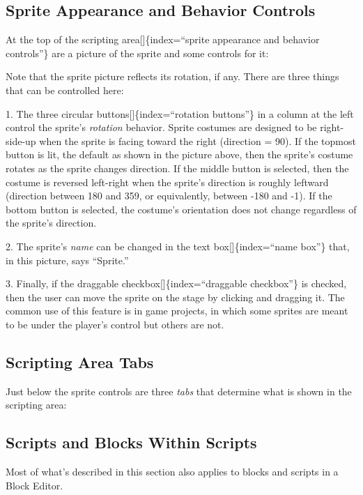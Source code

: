 \documentclass[
  letterpaper,
]{book}
\begin{document}
\subsection{Sprite Appearance and Behavior
Controls}\label{sprite-appearance-and-behavior-controls}

At the top of the scripting area{[}{]}\{index=``sprite appearance and
behavior controls''\} are a picture of the sprite and some controls for
it:

Note that the sprite picture reflects its rotation, if any. There are
three things that can be controlled here:

1. The three circular buttons{[}{]}\{index=``rotation buttons''\} in a
column at the left control the sprite's \emph{rotation} behavior. Sprite
costumes are designed to be right-side-up when the sprite is facing
toward the right (direction = 90). If the topmost button is lit, the
default as shown in the picture above, then the sprite's costume rotates
as the sprite changes direction. If the middle button is selected, then
the costume is reversed left-right when the sprite's direction is
roughly leftward (direction between 180 and 359, or equivalently,
between -180 and -1). If the bottom button is selected, the costume's
orientation does not change regardless of the sprite's direction.

2. The sprite's \emph{name} can be changed in the text
box{[}{]}\{index=``name box''\} that, in this picture, says ``Sprite.''

3. Finally, if the draggable checkbox{[}{]}\{index=``draggable
checkbox''\} is checked, then the user can move the sprite on the stage
by clicking and dragging it. The common use of this feature is in game
projects, in which some sprites are meant to be under the player's
control but others are not.

\subsection{Scripting Area Tabs}\label{scripting-area-tabs}

Just below the sprite controls are three \emph{tabs} that determine what
is shown in the scripting area:

\subsection{Scripts and Blocks Within
Scripts}\label{scripts-and-blocks-within-scripts}

Most of what's described in this section also applies to blocks and
scripts in a Block Editor.
\end{document}
